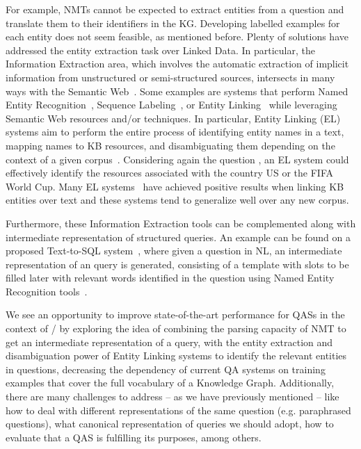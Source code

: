 For example, NMTs cannot be expected to extract entities from a question and translate them to their 
identifiers in the KG. Developing labelled examples for each entity does not seem feasible, as 
mentioned before. Plenty of solutions have addressed the entity extraction task over Linked Data. In 
particular, the Information Extraction area, which involves the automatic extraction of implicit 
information from unstructured or semi-structured sources, intersects in many ways with the 
Semantic Web~\cite{infExtr:MartinezHL19}. Some examples are systems that perform Named Entity 
Recognition~\cite{ner:LampleBSKD16}, Sequence Labeling~\cite{seqlab:MaH16, 
seqlab:contextual-emb-AkbikBV18}, or Entity Linking~\cite{EL:dbpedia-spotlight-MendesJGB11, 
EL:aida-tool-YosefHBSW11, EL:tagme-FerraginaS10, EL:opentapioca-Delpeuch19} while leveraging Semantic 
Web resources and/or techniques. In particular, Entity Linking (EL) systems aim to perform the entire 
process of identifying entity names in a text, mapping names to KB resources, and disambiguating them 
depending on the context of a given corpus~\cite{EL:survey-WuHH18}. Considering again the question 
, an EL system could effectively 
identify the resources associated with the country US or the FIFA World Cup. Many EL 
systems~\cite{EL:dbpedia-spotlight-MendesJGB11, EL:aida-tool-YosefHBSW11, EL:tagme-FerraginaS10, 
EL:opentapioca-Delpeuch19} have achieved positive results when linking KB entities over text and 
these systems tend to generalize well over any new corpus. 

Furthermore, these Information Extraction tools can be complemented along with intermediate 
representation of structured queries. An example can be found on a proposed 
Text-to-SQL system~\cite{semPar:txt-to-sql-RadevKZZFRS18}, where given a question in NL, an 
intermediate representation of an \SQL{} query is generated, consisting of a \SQL{} template with slots to 
be filled later with relevant words identified in the question using Named Entity Recognition 
tools~\cite{ner:dynet-NeubigDGMAABCCC17}.

We see an opportunity to improve state-of-the-art performance for QASs in the context 
of \RDF/\SPARQL{} by exploring the idea of combining the parsing capacity of NMT to get an 
intermediate representation of a \SPARQL{} query, with the entity extraction and disambiguation 
power of Entity Linking systems to identify the relevant entities in questions, decreasing 
the dependency of current QA systems on training examples that cover the full vocabulary of a 
Knowledge Graph. Additionally, there are many challenges to address – as we have previously mentioned 
– like how to deal with different representations of the same question (e.g. paraphrased questions), 
what canonical representation of \SPARQL{} queries we should adopt, how to evaluate 
that a QAS is fulfilling its purposes, among others.